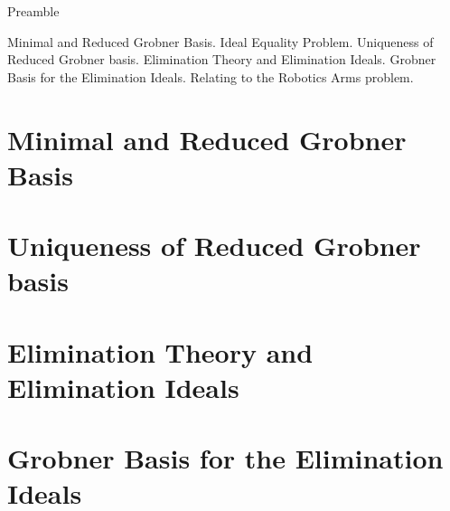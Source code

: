 
\noindent
Preamble

Minimal and Reduced Grobner Basis. Ideal Equality Problem. Uniqueness of Reduced Grobner basis. Elimination Theory and Elimination Ideals. Grobner Basis for the Elimination Ideals. Relating to the Robotics Arms problem.


\section{Minimal and Reduced Grobner Basis}

\section{Uniqueness of Reduced Grobner basis}

\section{Elimination Theory and Elimination Ideals}

\section{Grobner Basis for the Elimination Ideals}